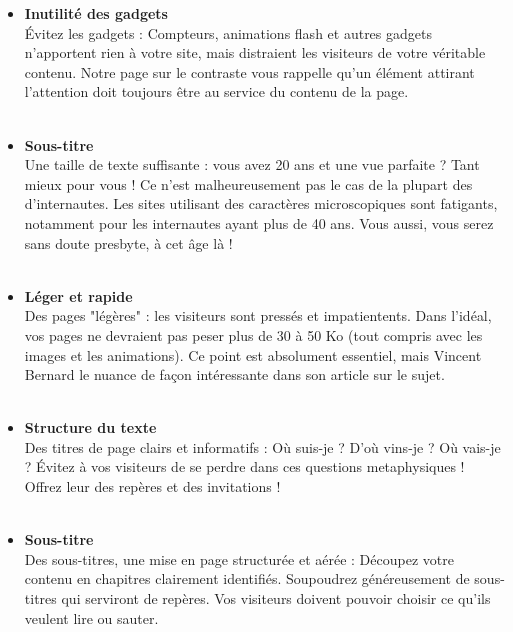 \documentclass[11pt,twoside,a4paper]{article}
\begin{document}
{{\begin{minipage}[t]{18cm}
\begin{itemize}
	\item[] \textbf{Inutilit{\'e} des gadgets}~\\
	{\'E}vitez les gadgets : Compteurs, animations flash et autres gadgets n'apportent rien {\`a} votre site, mais distraient les visiteurs de votre v{\'e}ritable contenu. Notre page sur le contraste vous rappelle qu'un {\'e}l{\'e}ment attirant l'attention doit toujours {\^e}tre au service du contenu de la page.~\\~\\

	\item[] \textbf{Sous-titre}~\\
	Une taille de texte suffisante : vous avez 20 ans et une vue parfaite ? Tant mieux pour vous ! Ce n'est malheureusement pas le cas de la plupart des d'internautes. Les sites utilisant des caract{\`e}res microscopiques sont fatigants, notamment pour les internautes ayant plus de 40 ans. Vous aussi, vous serez sans doute presbyte, {\`a} cet {\^a}ge l{\`a} !~\\~\\

	\item[] \textbf{L{\'e}ger et rapide}~\\
	Des pages "l{\'e}g{\`e}res" : les visiteurs sont press{\'e}s et impatientents. Dans l'id{\'e}al, vos pages ne devraient pas peser plus de 30 {\`a} 50 Ko (tout compris avec les images et les animations). Ce point est absolument essentiel, mais Vincent Bernard le nuance de fa\c{c}on int{\'e}ressante dans son article sur le sujet.~\\~\\

	\item[] \textbf{Structure du texte}~\\
	Des titres de page clairs et informatifs : O{\`u} suis-je ? D'o{\`u} vins-je ? O{\`u} vais-je ? {\'E}vitez {\`a} vos visiteurs de se perdre dans ces questions metaphysiques ! Offrez leur des rep{\`e}res et des invitations !~\\~\\

	\item[] \textbf{Sous-titre}~\\
	Des sous-titres, une mise en page structur{\'e}e et a{\'e}r{\'e}e : D{\'e}coupez votre contenu en chapitres clairement identifi{\'e}s. Soupoudrez g{\'e}n{\'e}reusement de sous-titres qui serviront de rep{\`e}res. Vos visiteurs doivent pouvoir choisir ce qu'ils veulent lire ou sauter.~\\~\\
	
\end{itemize}
\end{minipage}
 } }%
 
\end{document}
